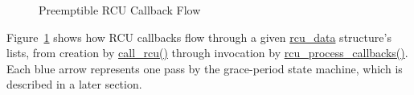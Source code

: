 \begin{figure}[htb]
\begin{center}
\end{center}
\caption{Preemptible RCU Callback Flow}
\label{app:rcuimpl:Preemptible RCU Callback Flow}
\end{figure}

Figure~\ref{app:rcuimpl:Preemptible RCU Callback Flow}
shows how RCU callbacks flow through a given
\url{rcu_data} structure's lists, from creation by
\url{call_rcu()} through invocation by
\url{rcu_process_callbacks()}.
Each blue arrow represents one pass by the grace-period state machine,
which is described in a later section.



